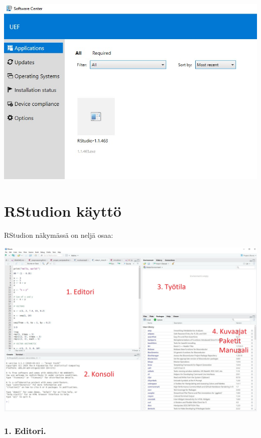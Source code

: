 \documentclass[
]{book}
\begin{document}
\includegraphics{files/00-start/RStudio_sc.jpg}

\hypertarget{rstudion-kuxe4yttuxf6}{%
\section*{RStudion käyttö}\label{rstudion-kuxe4yttuxf6}}

RStudion näkymässä on neljä osaa:

\includegraphics{files/00-start/RStudio_tutorial_edited.jpg}

\hypertarget{editori.}{%
\subsubsection*{1. Editori.}\label{editori.}}
\end{document}
